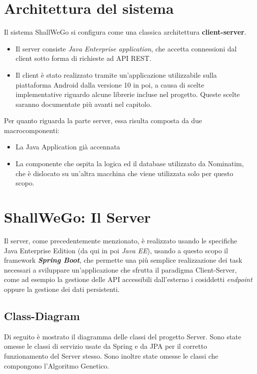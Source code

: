 \section{Architettura del sistema}
    Il sistema ShallWeGo si configura come una classica architettura \textbf{client-server}.
    \begin{itemize}
        \item Il server consiste \textit{Java Enterprise application}, che accetta connessioni dal client sotto forma di richieste ad API REST.
        \item Il client è stato realizzato tramite un'applicazione utilizzabile sulla piattaforma Android dalla versione 10 in poi, a causa di scelte implementative riguardo alcune librerie incluse nel progetto. Queste scelte saranno documentate più avanti nel capitolo.
    \end{itemize}

    Per quanto riguarda la parte server, essa risulta composta da due macrocomponenti:

    \begin{itemize}
        \item La Java Application già accennata
        \item La componente che ospita la logica ed il database utilizzato da Nominatim, che è dislocato su un'altra macchina che viene utilizzata solo per questo scopo.
    \end{itemize}

\section{ShallWeGo: Il Server}
    Il server, come precedentemente menzionato, è realizzato usando le specifiche Java Enterprise Edition (da qui in poi \textit{Java EE}), usando a questo scopo il framework \textbf{\textit{Spring Boot}}, che permette una più semplice realizzazione dei task necessari a sviluppare un'applicazione che sfrutta il paradigma Client-Server, come ad esempio la gestione delle API accessibili dall'esterno i cosiddetti \textit{endpoint} oppure la gestione dei dati persistenti.

    \subsection{Class-Diagram}
        Di seguito è mostrato il diagramma delle classi del progetto Server. Sono state omesse le classi di servizio usate da Spring e da JPA per il corretto funzionamento del Server stesso. Sono inoltre state omesse le classi che compongono l'Algoritmo Genetico.

